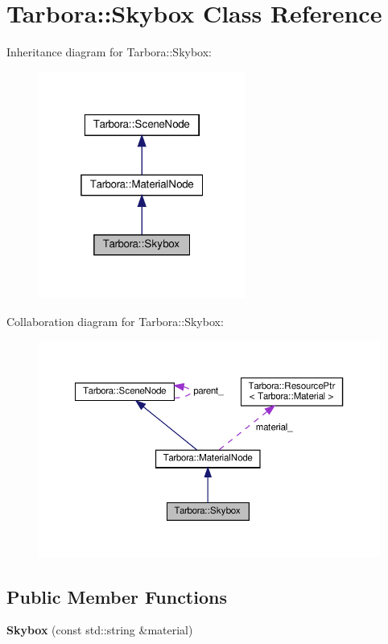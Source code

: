 \hypertarget{classTarbora_1_1Skybox}{}\section{Tarbora\+:\+:Skybox Class Reference}
\label{classTarbora_1_1Skybox}


Inheritance diagram for Tarbora\+:\+:Skybox\+:\nopagebreak
\begin{figure}[H]
\begin{center}
\leavevmode
\includegraphics[width=193pt]{classTarbora_1_1Skybox__inherit__graph}
\end{center}
\end{figure}


Collaboration diagram for Tarbora\+:\+:Skybox\+:\nopagebreak
\begin{figure}[H]
\begin{center}
\leavevmode
\includegraphics[width=350pt]{classTarbora_1_1Skybox__coll__graph}
\end{center}
\end{figure}
\subsection*{Public Member Functions}
\begin{DoxyCompactItemize}
\item 
\mbox{\label{classTarbora_1_1Skybox_abe7e80c249015320a22323ea920310de}} 
{\bfseries Skybox} (const std\+::string \&material)
\end{DoxyCompactItemize}

